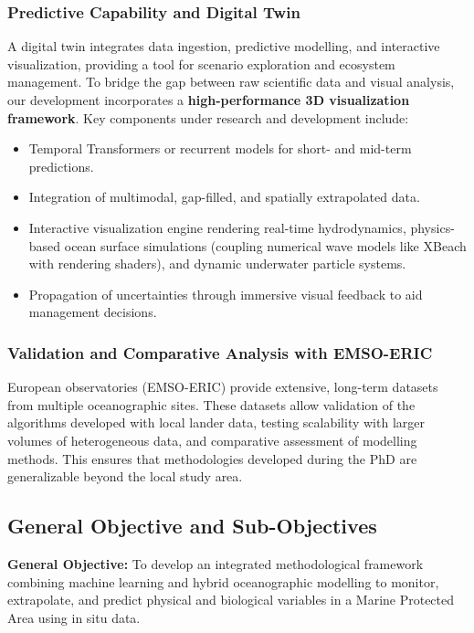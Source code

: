 \documentclass[12pt,a4paper]{article}
\begin{document}
\subsubsection{Predictive Capability and Digital Twin}
A digital twin integrates data ingestion, predictive modelling, and interactive visualization, providing a tool for scenario exploration and ecosystem management. To bridge the gap between raw scientific data and visual analysis, our development incorporates a \textbf{high-performance 3D visualization framework}. Key components under research and development include:
\begin{itemize}[noitemsep]
    \item Temporal Transformers or recurrent models for short- and mid-term predictions.
    \item Integration of multimodal, gap-filled, and spatially extrapolated data.
    \item Interactive visualization engine rendering real-time hydrodynamics, physics-based ocean surface simulations (coupling numerical wave models like XBeach with rendering shaders), and dynamic underwater particle systems.
    \item Propagation of uncertainties through immersive visual feedback to aid management decisions.
\end{itemize}

\subsubsection{Validation and Comparative Analysis with EMSO-ERIC}
European observatories (EMSO-ERIC) provide extensive, long-term datasets from multiple oceanographic sites. These datasets allow validation of the algorithms developed with local lander data, testing scalability with larger volumes of heterogeneous data, and comparative assessment of modelling methods. This ensures that methodologies developed during the PhD are generalizable beyond the local study area.

\subsection{General Objective and Sub-Objectives}

\textbf{General Objective:}
To develop an integrated methodological framework combining machine learning and hybrid oceanographic modelling to monitor, extrapolate, and predict physical and biological variables in a Marine Protected Area using in situ data.
\end{document}

